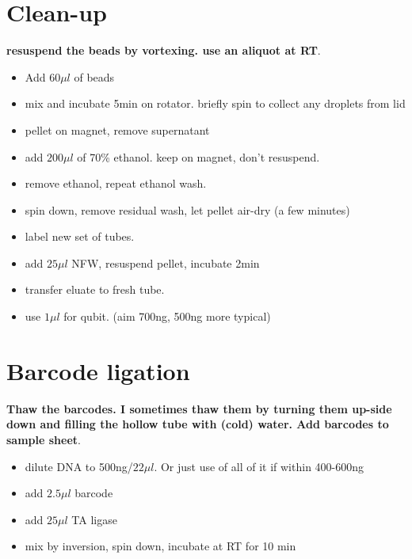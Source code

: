 \documentclass[aps,rmp]{revtex4}
\begin{document}
\section*{Clean-up}
{\bf resuspend the beads by vortexing. use an aliquot at RT}.
\begin{itemize}
	\item Add $60\mu l$ of beads
	\item mix and incubate 5min on rotator. briefly spin to collect any droplets from lid
	\item pellet on magnet, remove supernatant
	\item add $200\mu l$ of 70\% ethanol. keep on magnet, don't resuspend.
	\item remove ethanol, repeat ethanol wash.
	\item spin down, remove residual wash, let pellet air-dry (a few minutes)
	\item label new set of tubes.
	\item add $25\mu l$ NFW, resuspend pellet, incubate 2min
	\item transfer eluate to fresh tube.
	\item use $1\mu l$ for qubit. (aim 700ng, 500ng more typical)
\end{itemize}

\section*{Barcode ligation}
{\bf Thaw the barcodes. I sometimes thaw them by turning them up-side down and filling the hollow tube with (cold) water. Add barcodes to sample sheet}.
\begin{itemize}
	\item dilute DNA to 500ng/$22\mu l$. Or just use of all of it if within 400-600ng
	\item add $2.5\mu l$ barcode
	\item add $25\mu l$ TA ligase
	\item mix by inversion, spin down, incubate at RT for 10 min
\end{itemize}
\end{document}
